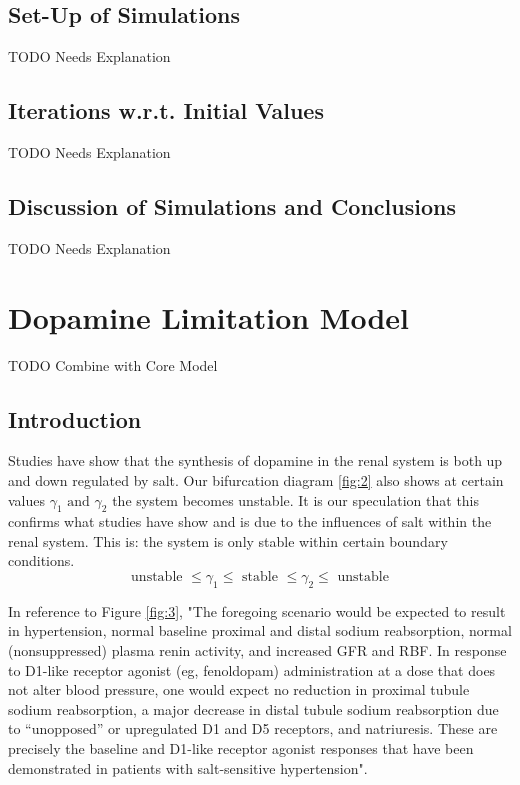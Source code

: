 \documentclass[smallextended]{svjour3}
\newcommand{\todo}[1]{{\huge\color{red}TODO {#1}}}
\begin{document}
\subsection{Set-Up of Simulations}
\todo{Needs Explanation}
\subsection{Iterations w.r.t. Initial Values}
\todo{Needs Explanation}  %
\subsection{Discussion of Simulations and Conclusions}
\todo{Needs Explanation} %

\section{ Dopamine Limitation Model }
\label{sec:6}
\todo{ Combine with Core Model}

\subsection{Introduction}
Studies have show that the synthesis of dopamine in the renal system is both up and down regulated by salt.  Our bifurcation diagram
 \ref{fig:2} %
also shows at certain values $\gamma_1 \text{ and } \gamma_2$ the system becomes unstable.  It is our speculation that this confirms what studies have show and is due to the influences of salt within the renal system. This is: the system is only stable within certain boundary conditions.  $$\text{ unstable  } \le \gamma_1 \le \text{ stable } \le \gamma_2 \le \text{ unstable }$$

In reference to Figure 
\ref{fig:3}, %
"The foregoing scenario would be expected to result in hypertension, normal baseline proximal and distal sodium reabsorption, normal (nonsuppressed) plasma renin activity, and increased GFR and RBF. In response to D1-like receptor agonist (eg, fenoldopam) administration at a dose that does not alter blood pressure, one would expect no reduction in proximal tubule sodium reabsorption, a major decrease in distal tubule sodium reabsorption due to “unopposed” or upregulated D1 and D5 receptors, and natriuresis. These are precisely the baseline and D1-like receptor agonist responses that have been demonstrated in patients with salt-sensitive hypertension".\cite{Ref30} 
\end{document}
